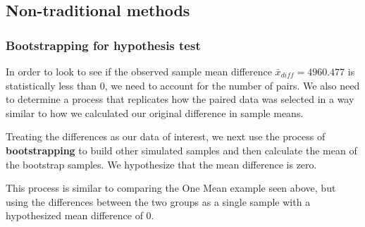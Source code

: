 \documentclass[12pt, krantz2,]{krantz}
\makeatletter
\newenvironment{Shaded}{\begin{snugshade}}{\end{snugshade}}
\newcommand{\DataTypeTok}[1]{\textcolor[rgb]{0.27,0.27,0.27}{#1}}
\newcommand{\DecValTok}[1]{\textcolor[rgb]{0.06,0.06,0.06}{#1}}
\newcommand{\KeywordTok}[1]{\textcolor[rgb]{0.27,0.27,0.27}{\textbf{#1}}}
\newcommand{\NormalTok}[1]{#1}
\newcommand{\OperatorTok}[1]{\textcolor[rgb]{0.43,0.43,0.43}{\textbf{#1}}}
\newcommand{\StringTok}[1]{\textcolor[rgb]{0.5,0.5,0.5}{#1}}
\newenvironment{kframe}{%
\medskip{}
\setlength{\fboxsep}{.8em}
 \def\at@end@of@kframe{}%
 \ifinner\ifhmode%
  \def\at@end@of@kframe{\end{minipage}}%
  \begin{minipage}{\columnwidth}%
 \fi\fi%
 \def\FrameCommand##1{\hskip\@totalleftmargin \hskip-\fboxsep
 \colorbox{shadecolor}{##1}\hskip-\fboxsep
     \hskip-\linewidth \hskip-\@totalleftmargin \hskip\columnwidth}%
 \MakeFramed {\advance\hsize-\width
   \@totalleftmargin\z@ \linewidth\hsize
   \@setminipage}}%
 {\par\unskip\endMakeFramed%
 \at@end@of@kframe}
\renewenvironment{Shaded}{\begin{kframe}}{\end{kframe}}
\makeatother
\begin{document}
\hypertarget{non-traditional-methods-4}{%
\subsection{Non-traditional methods}\label{non-traditional-methods-4}}

\hypertarget{bootstrapping-for-hypothesis-test-1}{%
\subsubsection*{Bootstrapping for hypothesis test}\label{bootstrapping-for-hypothesis-test-1}}


In order to look to see if the observed sample mean difference \(\bar{x}_{diff} = 4960.477\) is statistically less than 0, we need to account for the number of pairs. We also need to determine a process that replicates how the paired data was selected in a way similar to how we calculated our original difference in sample means.

Treating the differences as our data of interest, we next use the process of \textbf{bootstrapping} to build other simulated samples and then calculate the mean of the bootstrap samples. We hypothesize that the mean difference is zero.

This process is similar to comparing the One Mean example seen above, but using the differences between the two groups as a single sample with a hypothesized mean difference of 0.

\begin{Shaded}
\end{Shaded}

\begin{Shaded}
\end{Shaded}
\end{document}
